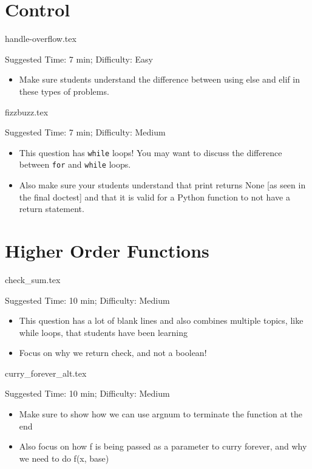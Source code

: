 \documentclass{exam}
\begin{document}
\section{Control}
\begin{questions}
    {handle-overflow.tex}
    \begin{questionmeta}
        Suggested Time: 7 min; Difficulty: Easy
        \begin{itemize}
            \item Make sure students understand the difference between using else and elif in these types of problems.
        \end{itemize}
    \end{questionmeta}

    {fizzbuzz.tex}
    \begin{questionmeta}
        Suggested Time: 7 min; Difficulty: Medium
        \begin{itemize}
            \item This question has \lstinline{while} loops! You may want to discuss the difference between \lstinline{for} and \lstinline{while} loops. 
            \item Also make sure your students understand that print returns None [as seen in the final doctest] and that it is valid for a Python function to not have a return statement.
        \end{itemize}
    \end{questionmeta}
\end{questions}

\section{Higher Order Functions}
\begin{questions}
    {check_sum.tex}
    \begin{questionmeta}
        Suggested Time: 10 min; Difficulty: Medium
        \begin{itemize}
            \item This question has a lot of blank lines and also combines multiple topics, like while loops, that students have been learning
            \item Focus on why we return check, and not a boolean! 
        \end{itemize}
    \end{questionmeta}

    {curry_forever_alt.tex}
    \begin{questionmeta}
        Suggested Time: 10 min; Difficulty: Medium
        \begin{itemize}
            \item Make sure to show how we can use argnum to terminate the function at the end
            \item Also focus on how f is being passed as a parameter to curry forever, and why we need to do f(x, base)
        \end{itemize}
    \end{questionmeta}

\end{questions}
\end{document}
